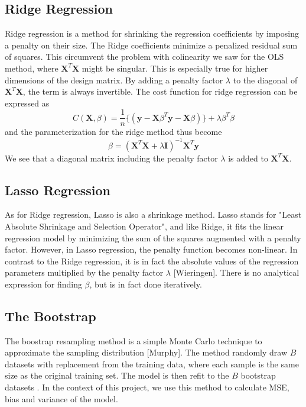 \documentclass{article}
\begin{document}
\subsection{Ridge Regression}
Ridge regression is a method for shrinking the regression coefficients by imposing a penalty on their size. The Ridge coefficients minimize a penalized residual sum of squares. This circumvent the problem with colinearity we saw for the OLS method, where $\textbf{X}^{T}\textbf{X}$ might be singular. This is especially true for higher dimensions of the design matrix. By adding a penalty factor $\lambda$ to the diagonal of $\textbf{X}^{T}\textbf{X}$, the term is always invertible. The cost function for ridge regression can be expressed as
\begin{equation}
C(\textbf{X},\beta) = \dfrac{1}{n} \{( \textbf{y}-\textbf{X}\beta^{T}\textbf{y}-\textbf{X}\beta)\} + \lambda \beta^{T} \beta 
\end{equation}
and the parameterization for the ridge method thus become
\begin{equation}
\beta = (\textbf{X}^{T}\textbf{X} + \lambda\textbf{I})^{-1}\textbf{X}^{T}\textbf{y}
\end{equation}
We see that a diagonal matrix including the penalty factor $\lambda$ is added to $\textbf{X}^{T}\textbf{X}$. 
\subsection{Lasso Regression}
As for Ridge regression, Lasso is also a shrinkage method. Lasso stands for "Least Absolute Shrinkage and Selection Operator", and like Ridge, it fits the linear regression model by minimizing the sum of the squares augmented with a penalty factor. However, in Lasso regression, the penalty function becomes non-linear. In contrast to the Ridge regression, it is in fact the absolute values of the regression parameters multiplied by the penalty factor $\lambda$ [Wieringen]. There is no analytical expression for finding $\beta$, but is in fact done iteratively. 
\subsection{The Bootstrap}
The boostrap resampling method is a simple Monte Carlo technique to approximate the sampling distribution [Murphy]. The method randomly draw $B$ datasets with replacement from the training data, where each sample is the same size as the original training set. The model is then refit to the $B$ bootstrap datasets \cite{Hastie et al.}. In the context of this project, we use this method to calculate MSE, bias and variance of the model.
\end{document}
